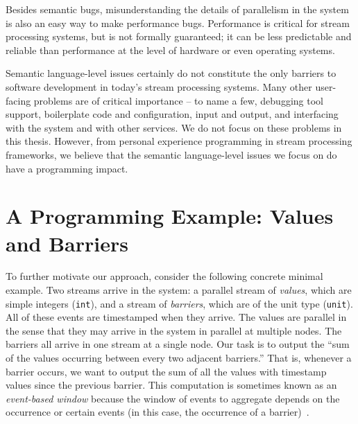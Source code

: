 Besides semantic bugs, misunderstanding the details of parallelism in the system is also an easy way to make performance bugs. Performance is critical for stream processing systems, but is not formally guaranteed; it can be less predictable and reliable than performance at the level of hardware or even operating systems.

Semantic language-level issues certainly do not constitute the only barriers to software development in today's stream processing systems. Many other user-facing problems are of critical importance -- to name a few, debugging tool support, boilerplate code and configuration, input and output, and interfacing with the system and with other services. We do not focus on these problems in this thesis. However, from personal experience programming in stream processing frameworks, we believe that the semantic language-level issues we focus on do have a programming impact.

\section{A Programming Example: Values and Barriers}
\label{ex:value-barrier}

To further motivate our approach, consider the following concrete minimal example.
Two streams arrive in the system: a parallel stream of \emph{values}, which are simple integers (\texttt{int}), and a stream of \emph{barriers}, which are of the unit type (\texttt{unit}).
All of these events are timestamped when they arrive.
The values are parallel in the sense that they may arrive in the system in parallel at multiple nodes.
The barriers all arrive in one stream at a single node.
Our task is to output the ``sum of the values occurring between every two adjacent barriers.'' That is, whenever a barrier occurs, we want to output the sum of all the values with timestamp values since the previous barrier. This computation is sometimes known as an \emph{event-based window} because the window of events to aggregate depends on the occurrence or certain events (in this case, the occurrence of a barrier)~\cite{EventBasedWindow}.

